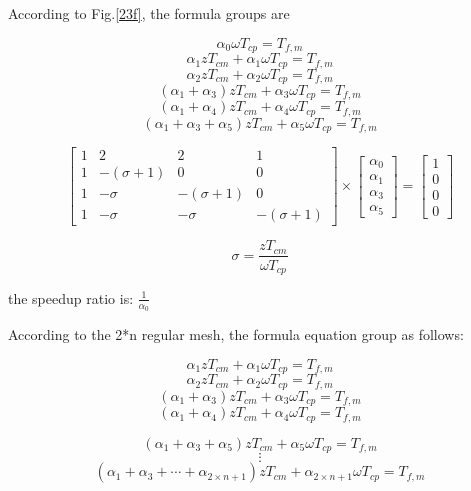 \vspace*{50pt}

According to Fig.\ref{23f}, the formula groups are

$$\alpha_{0} \omega T_{cp} = T_{f,m}$$ 
$$\alpha_{1}zT_{cm} + \alpha_{1} \omega T_{cp} = T_{f,m}$$
$$\alpha_{2}zT_{cm} + \alpha_{2} \omega T_{cp} = T_{f,m}$$
$$(\alpha_{1} + \alpha_{3})zT_{cm} + \alpha_{3}\omega T_{cp} = T_{f,m}$$
$$(\alpha_{1} + \alpha_{4})zT_{cm} + \alpha_{4}\omega T_{cp} = T_{f,m}$$
$$(\alpha_{1} + \alpha_{3} + \alpha_{5})zT_{cm} + \alpha_{5}\omega T_{cp} = T_{f,m}$$

\begin{equation}
{
\left[ \begin{array}{cccc}
1 & 2 & 2 & 1\\
1 & -(\sigma + 1) & 0 & 0\\
1 & -\sigma & -(\sigma + 1) & 0\\
1 & -\sigma & -\sigma & -(\sigma + 1)
\end{array} 
\right ]} \times \left[ \begin{array}{c}
\alpha_{0} \\
\alpha_{1} \\
\alpha_{3} \\
\alpha_{5}
\end{array} 
\right ] = \left[ \begin{array}{c}
1 \\
0 \\
0 \\
0
\end{array} 
\right ]
\end{equation}

$$\sigma = \frac{zT_{cm}}{\omega T_{cp}}$$

the speedup ratio is:
$\frac{1}{\alpha_{0}}$

\vspace*{50pt}

According to the 2*n regular mesh, the formula equation group as follows:

$$\alpha_{1}zT_{cm} + \alpha_{1} \omega T_{cp} = T_{f,m}$$
$$\alpha_{2}zT_{cm} + \alpha_{2} \omega T_{cp} = T_{f,m}$$
$$(\alpha_{1} + \alpha_{3})zT_{cm} + \alpha_{3}\omega T_{cp} = T_{f,m}$$
$$(\alpha_{1} + \alpha_{4})zT_{cm} + \alpha_{4}\omega T_{cp} = T_{f,m}$$

$$(\alpha_{1} + \alpha_{3} + \alpha_{5})zT_{cm} + \alpha_{5}\omega T_{cp} = T_{f,m}$$
$$\vdots$$
$$(\alpha_{1} + \alpha_{3} +\cdots + \alpha_{2 \times n + 1})zT_{cm} +\alpha_{2 \times n + 1} \omega T_{cp} = T_{f,m}$$

